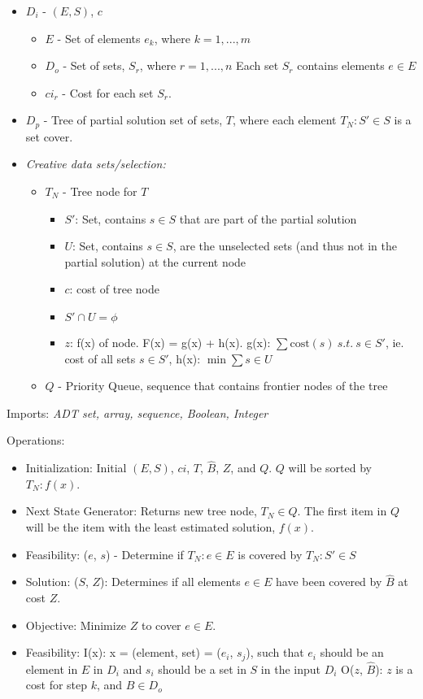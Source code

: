 \documentclass[12pt]{article}
\begin{document}
	\begin{itemize}
		\item $D_i$ - $(E, S)$, $c$
		\begin{itemize}
			\item $E$ - Set of elements $e_k$, where $k = 1,...,m$
			\item $D_o$ - Set of sets, $S_r$, where $r = 1,...,n$ Each set $S_r$ contains elements $e \in E$
			\item $ci_r$ - Cost for each set $S_r$.
		\end{itemize}
		\item $D_p$ - Tree of partial solution set of sets, $T$, where each element $T_N: S\prime \in S$ is a set cover.
	\end{itemize}
	\begin{itemize}
		\item \textit{Creative data sets/selection:}
		\begin{itemize}
			\item $T_N$ - Tree node for $T$
			\begin{itemize}	
				\item $S\prime$: Set, contains $s \in S$ that are part of the partial solution
				\item $U$: Set, contains $s \in S$, are the unselected sets (and thus not in the partial solution) at the current node
				\item $c$: cost of tree node
				\item $S\prime \cap U = \phi$					\item $z$: f(x) of node. F(x) = g(x) + h(x). g(x): $\sum \text{cost}(s) \: s.t. \: s \in S\prime$, ie. cost of all sets $s \in S\prime$, h(x): $\min \sum s \in U$
			\end{itemize}
			\item $Q$ - Priority Queue, sequence that contains frontier nodes of the tree
		\end{itemize}
	\end{itemize}
	
	Imports: \textit{ADT set, array, sequence, Boolean, Integer}
	
	Operations:
	\begin{itemize}
		\item Initialization: Initial $(E, S)$, $ci$, $T$, $\hat{B}$, $Z$, and $Q$. $Q$ will be sorted by $T_N: f(x)$.
		\item Next State Generator: Returns new tree node, $T_N \in Q$. The first item in $Q$ will be the item with the least estimated solution, $f(x)$.
		\item Feasibility: ($e$, $s$) - Determine if $T_N : e \in E$ is covered by $T_N : S\prime \in S$
		\item Solution: ($S$, $Z$): Determines if all elements $e \in E$ have been covered by $\hat{B}$ at cost $Z$.
		\item Objective: Minimize $Z$ to cover $e \in E$.
		\item Feasibility: I(x): x = (element, set) = ($e_i$, $s_j$), such that $e_i$ should be an element in $E$ in $D_i$ and $s_i$ should be a set in $S$ in the input $D_i$
		O($z$, $\hat{B}$): $z$ is a cost for step $k$, and $B \in D_o$
	\end{itemize}
	
\end{document}
